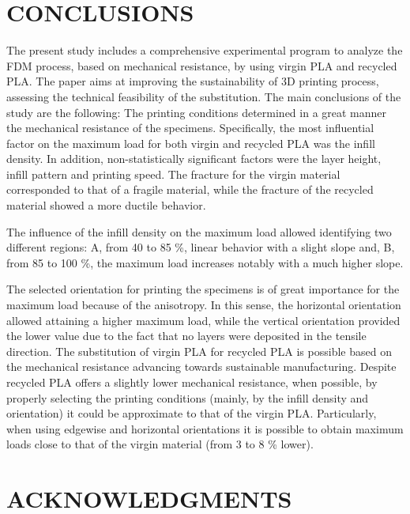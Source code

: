 \documentclass[]{elsarticle} %
\begin{document}
\hypertarget{conclusions}{%
\section{CONCLUSIONS}\label{conclusions}}

The present study includes a comprehensive experimental program to
analyze the FDM process, based on mechanical resistance, by using virgin
PLA and recycled PLA. The paper aims at improving the sustainability of
3D printing process, assessing the technical feasibility of the
substitution. The main conclusions of the study are the following: The
printing conditions determined in a great manner the mechanical
resistance of the specimens. Specifically, the most influential factor
on the maximum load for both virgin and recycled PLA was the infill
density. In addition, non-statistically significant factors were the
layer height, infill pattern and printing speed. The fracture for the
virgin material corresponded to that of a fragile material, while the
fracture of the recycled material showed a more ductile behavior.

The influence of the infill density on the maximum load allowed
identifying two different regions: A, from 40 to 85 \%, linear behavior
with a slight slope and, B, from 85 to 100 \%, the maximum load
increases notably with a much higher slope.

The selected orientation for printing the specimens is of great
importance for the maximum load because of the anisotropy. In this
sense, the horizontal orientation allowed attaining a higher maximum
load, while the vertical orientation provided the lower value due to the
fact that no layers were deposited in the tensile direction. The
substitution of virgin PLA for recycled PLA is possible based on the
mechanical resistance advancing towards sustainable manufacturing.
Despite recycled PLA offers a slightly lower mechanical resistance, when
possible, by properly selecting the printing conditions (mainly, by the
infill density and orientation) it could be approximate to that of the
virgin PLA. Particularly, when using edgewise and horizontal
orientations it is possible to obtain maximum loads close to that of the
virgin material (from 3 to 8 \% lower).

\hypertarget{acknowledgments}{%
\section{ACKNOWLEDGMENTS}\label{acknowledgments}}
\end{document}
